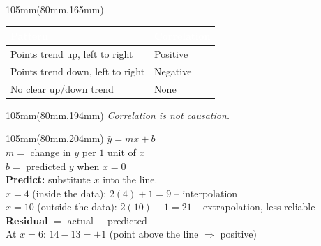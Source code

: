 \documentclass[a4paper]{article}
\renewcommand{\arraystretch}{1.5}
\begin{document}
\begin{textblock*}{105mm}(80mm,165mm)
{\fontsize{10}{12}\selectfont\renewcommand{\arraystretch}{1.35}\setlength{\tabcolsep}{4pt}
\begin{tabular}{|p{62mm}|>{\centering\arraybackslash}p{24mm}|}
\hline
\cellcolor{accent}\textcolor{white}{\textbf{Pattern}} & \cellcolor{accent}\textcolor{white}{\textbf{Correlation}}\\ \hline
Points trend up, left to right & Positive\\ \hline
Points trend down, left to right & Negative\\ \hline
No clear up/down trend & None\\ \hline
\end{tabular}}
\end{textblock*}

\begin{textblock*}{105mm}(80mm,194mm)
{\fontsize{10}{13}\selectfont\color{black!55}\itshape
Correlation is not causation.}
\end{textblock*}

\begin{textblock*}{105mm}(80mm,204mm)
{\fontsize{13}{16}\selectfont $\hat y=mx+b$}\\[1mm]
{\fontsize{10.5}{13}\selectfont
$m=$ change in $y$ per $1$ unit of $x$\\
$b=$ predicted $y$ when $x=0$\\[1.5mm]
\textbf{Predict:} substitute $x$ into the line.\\
$x=4$ (inside the data): $2(4)+1=9$ \;--\; interpolation\\
$x=10$ (outside the data): $2(10)+1=21$ \;--\; extrapolation, less reliable\\[1.5mm]
\textbf{Residual} $=$ actual $-$ predicted\\
At $x=6$: $14-13=+1$ \;(point above the line $\Rightarrow$ positive)}
\end{textblock*}
\end{document}
